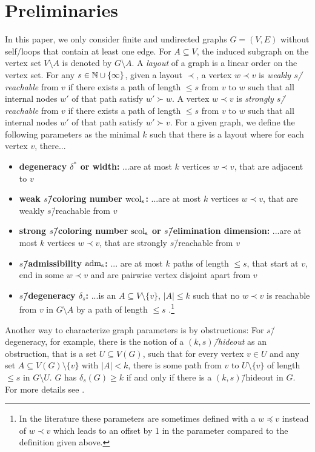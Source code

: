\section{Preliminaries}
In this paper, we only consider finite and undirected graphs $G=(V, E)$ without self\-/loops that contain at least one edge. For $A\subseteq V$, the induced subgraph on the vertex set $V\setminus A$ is denoted by $G\setminus A$. A \emph{layout} of a graph is a linear order on the vertex set. For any $s\in \mathbb{N} \cup \{\infty\}$, given a layout $\prec$, a vertex $w\prec v$ is \emph{weakly $s$\=/reachable} from $v$ if there exists a path of length $\leq s$ from $v$ to $w$ such that all internal nodes $w'$ of that path satisfy $w'\succ w$. A vertex $w\prec v$ is \emph{strongly $s$\=/reachable} from $v$ if there exists a path of length $\leq s$ from $v$ to $w$ such that all internal nodes $w'$ of that path satisfy $w'\succ v$.
For a given graph, we define the following parameters as the minimal $k$ such that there is a layout where for each vertex $v$, there...
\begin{itemize}
  \item \textbf{degeneracy $\delta^*$ or width:} ...are at most $k$ vertices $w\prec v$, that are adjacent to $v$ 
  \item \textbf{weak $s$\=/coloring number $\mathrm{wcol_{s}}$:} ...are at most $k$ vertices $w\prec v$, that are weakly $s$\=/reachable from $v$ 
  \item \textbf{strong $s$\=/coloring number $\mathrm{scol_{s}}$ or $s$\=/elimination dimension:} ...are at most $k$ vertices $w\prec v$, that are strongly $s$\=/reachable from $v$
  \item \textbf{$s$\=/admissibility $\mathrm{adm_{s}}$:} ... are at most $k$ paths of length $\leq s$, that start at $v$, end in some $w\prec v$ and are pairwise vertex disjoint apart from $v$ 
  \item \textbf{$s$\=/degeneracy $\delta_s$:} ...is an $A\subseteq V\setminus\{v\}$, $|A|\leq k$ such that no $w\prec v$ is reachable from $v$ in $G\setminus A$ by a path of length $\leq s$ .\footnote{In the literature these parameters are sometimes defined with a $w\preceq v$ instead of $w\prec v$ which leads to an offset by 1 in the parameter compared to the definition given above.}
\end{itemize}
Another way to characterize graph parameters is by obstructions: For $s$\=/degeneracy, for example, there is the notion of a \emph{$(k,s)$\=/hideout} as an obstruction, that is a set $U\subseteq V(G)$, such that for every vertex $v\in U$ and any set $A\subseteq V(G)\setminus \{v\}$ with $|A|<k$, there is some path from $v$ to $U\setminus \{v\}$ of length $\leq s$ in $G\setminus U$. $G$ has $\delta_s(G) \geq k$ if and only if there is a $(k,s)$\=/hideout in $G$. For more details see \cite{doi:10.1137/090780006}.
